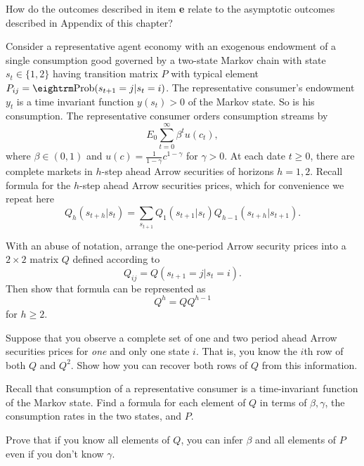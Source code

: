 \medskip
{}  How do the outcomes described in item {\bf e} relate to the asymptotic outcomes described in Appendix   of this  chapter?

\medskip

 
\medskip
\noindent Consider a representative agent economy with an exogenous endowment of a single consumption good governed by a two-state Markov chain
with state $s_t \in \{ 1, 2\}$ having transition  matrix $P$ with typical element $P_{ij} = {\rm Prob} (s_{t+1} = j | s_t = i)$.
The representative consumer's endowment $y_t$ is a time invariant function  $y(s_t)> 0$ of the Markov state. So is his consumption.
The representative consumer orders consumption streams by
$$ E_0 \sum_{t=0}^\infty \beta^t u(c_t), $$
where $\beta \in (0,1)$ and $u(c)= {\frac{1}{1-\gamma}}c^{1-\gamma}$ for $\gamma > 0$.
At each date $t \geq 0$, there are complete markets in $h$-step ahead Arrow securities of horizons $h=1,2$.
Recall formula  for the $h$-step ahead Arrow securities prices, which  for convenience we repeat here
$$ Q_h( s_{t+h} | s_t) = \sum_{s_{t+1}} Q_1(s_{t+1} | s_t)
                      Q_{h-1}( s_{t+h} | s_{t+1}). $$

\medskip
{} With an abuse of notation, arrange the one-period Arrow security prices into a $2 \times 2$ matrix $Q$ defined
according to
$$ Q_{ij} = Q(s_{t+1} = j| s_t = i). $$
Then show that formula  can be represented as
$$ Q^h = Q Q^{h-1} $$
for $h \geq 2$.

\medskip
{}  Suppose that you observe a complete set of one and two period ahead Arrow securities prices for {\it one\/} and only one state $i$.  That is,
you know the $i$th row of both $Q$ and $Q^2$.  Show how you can recover both rows of $Q$ from this information.

\medskip
{}  Recall  that consumption of a representative consumer is a time-invariant function of the Markov state.
Find a formula for each element of $Q$  in terms of $\beta, \gamma$, the consumption rates in the two states, and  $P$.

\medskip
{} Prove that if you  know all elements of $Q$, you can infer $\beta$ and all elements of $P$ even if you don't know  $\gamma$.


\medskip

